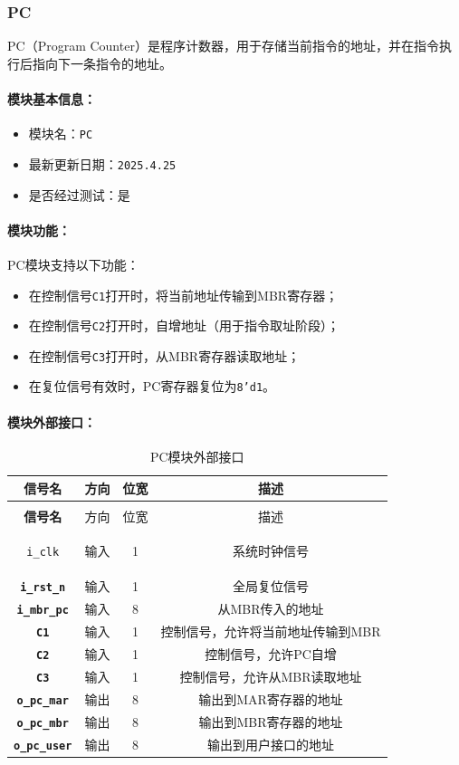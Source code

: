 \documentclass[lang=cn,a4paper,newtx]{elegantpaper}
\begin{document}
\subsubsection{PC}
PC（Program Counter）是程序计数器，用于存储当前指令的地址，并在指令执行后指向下一条指令的地址。

\paragraph{模块基本信息：}
\begin{itemize}
  \item 模块名：\texttt{PC}
  \item 最新更新日期：\texttt{2025.4.25}
  \item 是否经过测试：是
\end{itemize}

\paragraph{模块功能：}
PC模块支持以下功能：
\begin{itemize}
  \item 在控制信号\texttt{C1}打开时，将当前地址传输到MBR寄存器；
  \item 在控制信号\texttt{C2}打开时，自增地址（用于指令取址阶段）；
  \item 在控制信号\texttt{C3}打开时，从MBR寄存器读取地址；
  \item 在复位信号有效时，PC寄存器复位为\texttt{8'd1}。
\end{itemize}

\paragraph{模块外部接口：}
\begin{longtable}{>{\bfseries}c c c c}
  \caption{PC模块外部接口} \\ 
  \toprule
  信号名 & 方向 & 位宽 & 描述 \\ 
  \midrule
  \endfirsthead

  \multicolumn{4}{l}{\textbf{（续表）PC模块外部接口}} \\ 
  \toprule
  信号名 & 方向 & 位宽 & 描述 \\ 
  \midrule
  \endhead

  \texttt{i\_clk} & 输入 & 1 & 系统时钟信号 \\ 
  \texttt{i\_rst\_n} & 输入 & 1 & 全局复位信号 \\ 
  \texttt{i\_mbr\_pc} & 输入 & 8 & 从MBR传入的地址 \\ 
  \texttt{C1} & 输入 & 1 & 控制信号，允许将当前地址传输到MBR \\ 
  \texttt{C2} & 输入 & 1 & 控制信号，允许PC自增 \\ 
  \texttt{C3} & 输入 & 1 & 控制信号，允许从MBR读取地址 \\ 
  \texttt{o\_pc\_mar} & 输出 & 8 & 输出到MAR寄存器的地址 \\ 
  \texttt{o\_pc\_mbr} & 输出 & 8 & 输出到MBR寄存器的地址 \\ 
  \texttt{o\_pc\_user} & 输出 & 8 & 输出到用户接口的地址 \\ 
  \bottomrule
\end{longtable}
\end{document}
